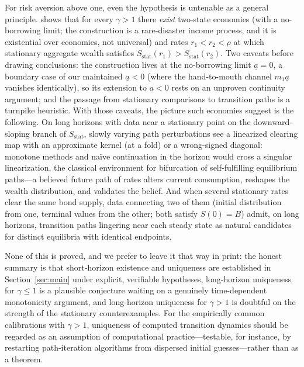 \documentclass[11pt]{article}
\theoremstyle{definition}
\theoremstyle{remark}
\newcommand{\ubar}[1]{\underline{#1}}
\newcommand{\uba}{\ubar{a}}
\begin{document}
For risk aversion above one, even the hypothesis is untenable as a
general principle. \citet[Thm.~1.10]{Hofer2025} shows that for every
$\gamma>1$ there \emph{exist} two-state economies (with a
no-borrowing limit; the construction is a rare-disaster income
process, and it is existential over economies, not universal) and
rates $r_1<r_2<\rho$ at which stationary aggregate wealth satisfies
$S_{\mathrm{stat}}(r_1)>S_{\mathrm{stat}}(r_2)$. Two caveats before
drawing conclusions: the construction lives at the no-borrowing limit
$\uba=0$, a boundary case of our maintained $\uba<0$ (where the
hand-to-mouth channel $m_1\uba$ vanishes identically), so its
extension to $\uba<0$ rests on an unproven continuity argument; and
the passage from stationary comparisons to transition paths is a
turnpike heuristic. With those caveats, the picture such economies
suggest is the following. On long horizons with data near a
stationary point on the downward-sloping branch of
$S_{\mathrm{stat}}$, slowly varying path perturbations see a
linearized clearing map with an approximate kernel (at a fold) or a
wrong-signed diagonal: monotone methods and na\"ive continuation in
the horizon would cross a singular linearization, the classical
environment for bifurcation of self-fulfilling equilibrium paths---a
believed future path of rates alters current consumption, reshapes
the wealth distribution, and validates the belief. And when several
stationary rates clear the same bond supply, data connecting two of
them (initial distribution from one, terminal values from the other;
both satisfy $S(0)=B$) admit, on long horizons, transition paths
lingering near each steady state as natural candidates for distinct
equilibria with identical endpoints.

None of this is proved, and we prefer to leave it that way in print:
the honest summary is that short-horizon existence and uniqueness are
established in Section~\ref{sec:main} under explicit, verifiable
hypotheses, long-horizon uniqueness for
$\gamma\le1$ is a plausible conjecture waiting on a genuinely
time-dependent monotonicity argument, and long-horizon uniqueness for
$\gamma>1$ is doubtful on the strength of the stationary
counterexamples. For the empirically common calibrations with
$\gamma>1$, uniqueness of computed transition dynamics should be
regarded as an assumption of computational practice---testable, for
instance, by restarting path-iteration algorithms from dispersed
initial guesses---rather than as a theorem.

\end{document}
